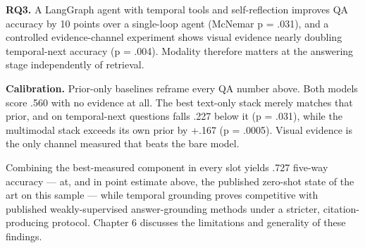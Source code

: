 \textbf{RQ3.} A LangGraph agent with temporal tools and self-reflection
improves QA accuracy by 10 points over a single-loop agent (McNemar p =
.031), and a controlled evidence-channel experiment shows visual
evidence nearly doubling temporal-next accuracy (p = .004). Modality
therefore matters at the answering stage independently of retrieval.

\textbf{Calibration.} Prior-only baselines reframe every QA number
above. Both models score .560 with no evidence at all. The best
text-only stack merely matches that prior, and on temporal-next
questions falls .227 below it (p = .031), while the multimodal stack
exceeds its own prior by +.167 (p = .0005). Visual evidence is the only
channel measured that beats the bare model.

Combining the best-measured component in every slot yields .727 five-way
accuracy --- at, and in point estimate above, the published zero-shot
state of the art on this sample --- while temporal grounding proves
competitive with published weakly-supervised answer-grounding methods
under a stricter, citation-producing protocol. Chapter 6 discusses the
limitations and generality of these findings.
